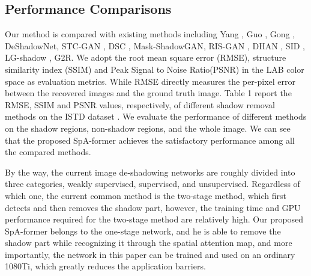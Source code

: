 \documentclass[journal]{IEEEtran}
\begin{document}
\subsection{ Performance Comparisons}
Our method is compared with existing methods including Yang \cite{17}, Guo \cite{15}, Gong \cite{16}, DeShadowNet\cite{1}, STC-GAN \cite{2}, DSC \cite{4}, Mask-ShadowGAN\cite{9}, RIS-GAN \cite{5}, DHAN \cite{6}, SID \cite{3}, LG-shadow \cite{10}, G2R\cite{11}. We adopt the root mean square error (RMSE), structure similarity index (SSIM) and Peak Signal to Noise Ratio(PSNR) in the LAB color space as evaluation metrics. While RMSE directly measures the per-pixel error between the recovered images and the ground truth image. Table 1 report the RMSE, SSIM and PSNR values, respectively, of different shadow removal methods on the ISTD dataset \cite{2}. We evaluate the performance of different methods on the shadow regions, non-shadow regions, and the whole image. We can see that the proposed SpA-former achieves the satisfactory performance among all the compared methods.
\par
By the way, the current image de-shadowing networks are roughly divided into three categories, weakly supervised, supervised, and unsupervised. Regardless of which one, the current common method is the two-stage method, which first detects and then removes the shadow part, however, the training time and GPU performance required for the two-stage method are relatively high. Our proposed SpA-former belongs to the one-stage network, and he is able to remove the shadow part while recognizing it through the spatial attention map, and more importantly, the network in this paper can be trained and used on an ordinary 1080Ti, which greatly reduces the application barriers.
\end{document}
